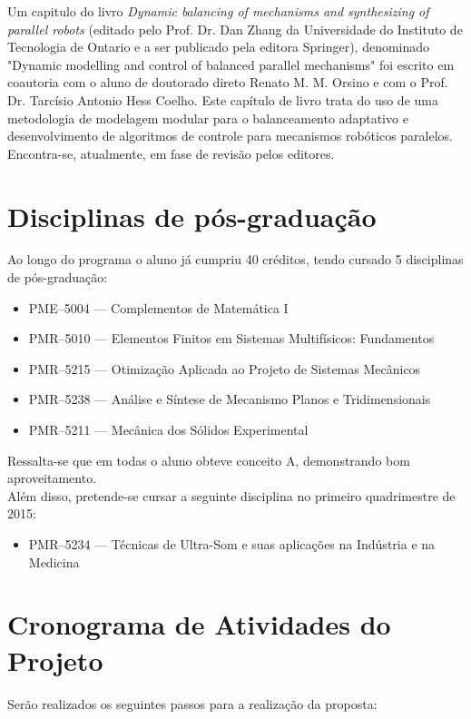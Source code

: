 \documentclass[a4paper,11pt,brazil,fleqn]{article}
\begin{document}
Um capitulo do livro {\em Dynamic balancing of mechanisms and synthesizing of parallel
robots}  (editado pelo Prof. Dr. Dan Zhang da Universidade do Instituto de Tecnologia
de Ontario e a ser publicado pela editora Springer), denominado "Dynamic modelling
and control of balanced parallel mechanisms" foi escrito em coautoria com o aluno de
doutorado direto Renato M. M. Orsino e com o Prof. Dr. Tarc\'isio Antonio Hess Coelho.
Este cap\'itulo de livro trata do uso de uma metodologia de modelagem modular para o
balanceamento adaptativo e desenvolvimento de algoritmos de controle para mecanismos
rob\'oticos paralelos. Encontra-se, atualmente, em fase de revis\~ao pelos editores.

\section{Disciplinas de p\'os-gradua\c{c}\~ao}\label{S06}

Ao longo do programa o aluno j\'a cumpriu 40 cr\'editos, tendo cursado 5 disciplinas 
de p\'os-gradua\c{c}\~ao:
\begin{itemize}
\item PME--5004 --- Complementos de Matem\'atica I
\item PMR--5010 --- Elementos Finitos em Sistemas Multif\'isicos: Fundamentos
\item PMR--5215 --- Otimiza\c{c}\~ao Aplicada ao Projeto de Sistemas Mec\^anicos
\item PMR--5238 --- An\'alise e S\'intese de Mecanismo Planos e Tridimensionais
\item PMR--5211 --- Mec\^anica dos S\'olidos Experimental
\end{itemize}

Ressalta-se que em todas o aluno obteve conceito A, demonstrando bom aproveitamento. \\

Al\'em disso, pretende-se cursar a seguinte disciplina no primeiro quadrimestre de 2015:
\begin{itemize}
\item PMR--5234 --- T\'ecnicas de Ultra-Som e suas aplica\c{c}\~oes na Ind\'ustria e na Medicina
\end{itemize}

\section{Cronograma de Atividades do Projeto}\label{S07}

Ser\~ao realizados os seguintes passos para a realiza\c{c}\~ao da proposta:
\end{document}
